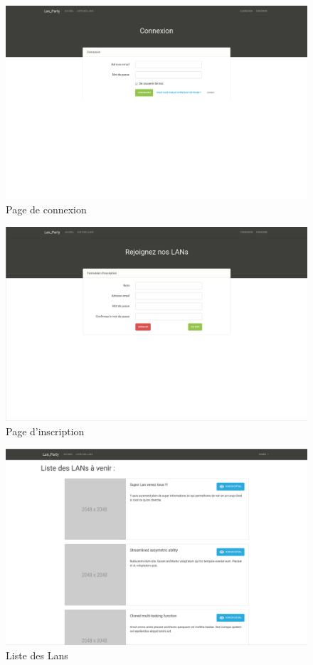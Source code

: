 \documentclass[12pt]{article}
\begin{document}
\begin{figure}[H]
\centering
\includegraphics[scale=0.20]{images/connexion.jpg}
\caption{Page de connexion}
\label{}
\end{figure}

\begin{figure}[H]
\centering
\includegraphics[scale=0.20]{images/inscription.png}
\caption{Page d'inscription}
\label{}
\end{figure}

\begin{figure}[H]
\centering
\includegraphics[scale=0.20]{images/liste.png}
\caption{Liste des Lans}
\label{}
\end{figure}
\end{document}
